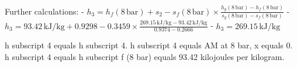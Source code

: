 Further calculations:
- \( h_3 = h_f(8 \, \text{bar}) + s_2 - s_f(8 \, \text{bar}) \times \frac{h_g(8 \, \text{bar}) - h_f(8 \, \text{bar})}{s_g(8 \, \text{bar}) - s_f(8 \, \text{bar})} \)
- \( h_3 = 93.42 \, \text{kJ/kg} + 0.9298 - 0.3459 \times \frac{269.15 \, \text{kJ/kg} - 93.42 \, \text{kJ/kg}}{0.9374 - 0.2666} \)
- \( h_3 = 269.15 \, \text{kJ/kg} \)

h subscript 4 equals h subscript 4.  
h subscript 4 equals AM at 8 bar, x equals 0.  
h subscript 4 equals h subscript f (8 bar) equals 93.42 kilojoules per kilogram.